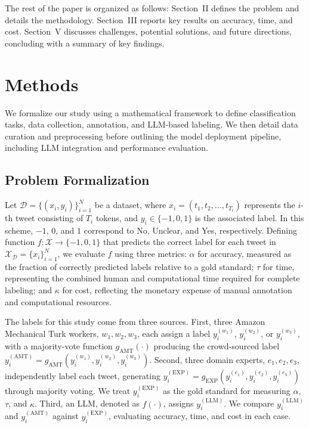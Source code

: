 \documentclass[letterpaper, 10 pt, conference]{ieeeconf} %
\begin{document}
The rest of the paper is organized as follows: Section~II defines the problem and details the methodology. Section~III reports key results on accuracy, time, and cost. Section~V discusses challenges, potential solutions, and future directions, concluding with a summary of key findings.

\vspace{-1.5mm}
\section{Methods}

We formalize our study using a mathematical framework to define classification tasks, data collection, annotation, and LLM-based labeling. We then detail data curation and preprocessing before outlining the model deployment pipeline, including LLM integration and performance evaluation.
\vspace{-0.5mm}
\subsection{Problem Formalization}


Let $\mathcal{D} = \{(x_i, y_i)\}_{i=1}^N$ be a dataset, where $x_i = (t_1, t_2, \dots, t_{T_i})$ represents the $i$-th tweet consisting of $T_i$ tokens, and $y_i \in \{-1, 0, 1\}$ is the associated label. In this scheme, $-1$, $0$, and $1$ correspond to \textquotesingle{}No\textquotesingle{}, \textquotesingle{}Unclear\textquotesingle{}, and \textquotesingle{}Yes\textquotesingle{}, respectively. Defining function $f: \mathcal{X} \to \{-1, 0, 1\}$ that predicts the correct label for each tweet in $\mathcal{X}_{\mathcal{D}} = \{x_i\}_{i=1}^N$, we evaluate $f$ using three metrics: $\alpha$ for accuracy, measured as the fraction of correctly predicted labels relative to a gold standard; $\tau$ for time, representing the combined human and computational time required for complete labeling; and $\kappa$ for cost, reflecting the monetary expense of manual annotation and computational resources.

The labels for this study come from three sources. First, three Amazon Mechanical Turk workers, ${w_1, w_2, w_3}$, each assign a label $y_i^{(w_1)}$, $y_i^{(w_2)}$, or $y_i^{(w_3)}$, with a majority-vote function $g_{\mathrm{AMT}}(\cdot)$ producing the crowd-sourced label $y_i^{(\mathrm{AMT})} = g_{\mathrm{AMT}}(y_i^{(w_1)}, y_i^{(w_2)}, y_i^{(w_3)})$. Second, three domain experts, ${e_1, e_2, e_3}$, independently label each tweet, generating $y_i^{(\mathrm{EXP})} = g_{\mathrm{EXP}}(y_i^{(e_1)}, y_i^{(e_2)}, y_i^{(e_3)})$ through majority voting. We treat $y_i^{(\mathrm{EXP})}$ as the gold standard for measuring $\alpha$, $\tau$, and $\kappa$. Third, an LLM, denoted as $f(\cdot)$, assigns $y_i^{(\mathrm{LLM})}$. We compare $y_i^{(\mathrm{LLM})}$ and $y_i^{(\mathrm{AMT})}$ against $y_i^{(\mathrm{EXP})}$, evaluating accuracy, time, and cost in each case.
\end{document}
